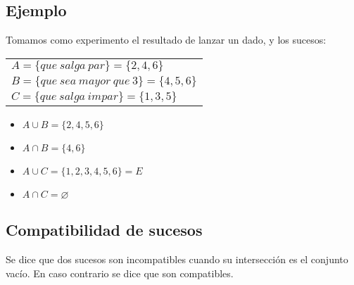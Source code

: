 \subsection{Ejemplo} Tomamos como experimento el resultado de lanzar un dado, y los sucesos: \\
\begin{tabular}{l}
$A=\lbrace que\ salga\ par\rbrace=\lbrace2,4,6\rbrace$ \\
$B=\lbrace que\ sea\ mayor\ que\ 3\rbrace=\lbrace4,5,6\rbrace$ \\
$C=\lbrace que\ salga\ impar\rbrace=\lbrace1,3,5\rbrace$
\end{tabular}
\begin{itemize}	
	\item $A\cup B=\lbrace2,4,5,6\rbrace$ \\
	\item $A\cap B=\lbrace4,6\rbrace$\\
\item $A\cup C=\lbrace1,2,3,4,5,6\rbrace=E$
\item $A\cap C=\varnothing$
\end{itemize}

\subsection{Compatibilidad de sucesos} Se dice que dos sucesos son incompatibles cuando su intersección es el conjunto vacío. En caso contrario se dice que son compatibles.

